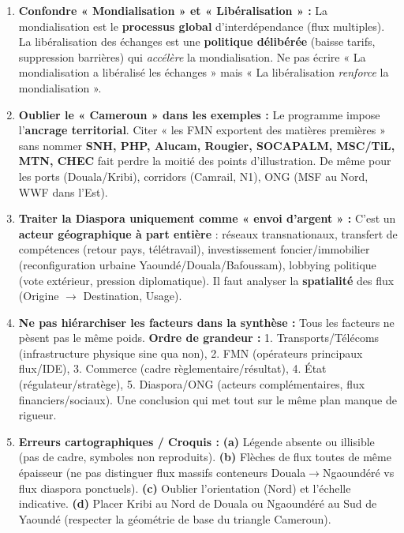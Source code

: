 \documentclass[11pt]{article}
\begin{document}
\begin{attention}
\begin{enumerate}
    \item \textbf{Confondre « Mondialisation » et « Libéralisation » :} La mondialisation est le \textbf{processus global} d'interdépendance (flux multiples). La libéralisation des échanges est une \textbf{politique délibérée} (baisse tarifs, suppression barrières) qui \emph{accélère} la mondialisation. Ne pas écrire « La mondialisation a libéralisé les échanges » mais « La libéralisation \emph{renforce} la mondialisation ».
    \item \textbf{Oublier le « Cameroun » dans les exemples :} Le programme impose l'\textbf{ancrage territorial}. Citer « les FMN exportent des matières premières » sans nommer \textbf{SNH, PHP, Alucam, Rougier, SOCAPALM, MSC/TiL, MTN, CHEC} fait perdre la moitié des points d'illustration. De même pour les ports (Douala/Kribi), corridors (Camrail, N1), ONG (MSF au Nord, WWF dans l'Est).
    \item \textbf{Traiter la Diaspora uniquement comme « envoi d'argent » :} C'est un \textbf{acteur géographique à part entière} : réseaux transnationaux, transfert de compétences (retour pays, télétravail), investissement foncier/immobilier (reconfiguration urbaine Yaoundé/Douala/Bafoussam), lobbying politique (vote extérieur, pression diplomatique). Il faut analyser la \textbf{spatialité} des flux (Origine $\rightarrow$ Destination, Usage).
    \item \textbf{Ne pas hiérarchiser les facteurs dans la synthèse :} Tous les facteurs ne pèsent pas le même poids. \textbf{Ordre de grandeur :} 1. Transports/Télécoms (infrastructure physique sine qua non), 2. FMN (opérateurs principaux flux/IDE), 3. Commerce (cadre règlementaire/résultat), 4. État (régulateur/stratège), 5. Diaspora/ONG (acteurs complémentaires, flux financiers/sociaux). Une conclusion qui met tout sur le même plan manque de rigueur.
    \item \textbf{Erreurs cartographiques / Croquis :} \textbf{(a)} Légende absente ou illisible (pas de cadre, symboles non reproduits). \textbf{(b)} Flèches de flux toutes de même épaisseur (ne pas distinguer flux massifs conteneurs Douala$\rightarrow$Ngaoundéré vs flux diaspora ponctuels). \textbf{(c)} Oublier l'orientation (Nord) et l'échelle indicative. \textbf{(d)} Placer Kribi au Nord de Douala ou Ngaoundéré au Sud de Yaoundé (respecter la géométrie de base du triangle Cameroun).
\end{enumerate}
\end{attention}
\end{document}
